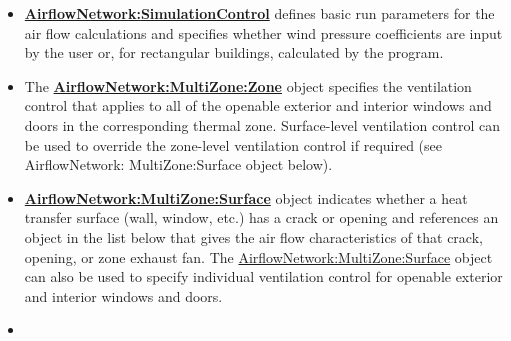 \begin{itemize}
\item
  \textbf{\hyperref[airflownetworksimulationcontrol]{AirflowNetwork:\hyperref[simulationcontrol]{SimulationControl}}} defines basic run parameters for the air flow calculations and specifies whether wind pressure coefficients are input by the user or, for rectangular buildings, calculated by the program.
\item
  The \textbf{\hyperref[airflownetworkmultizonezone]{AirflowNetwork:MultiZone:Zone}} object specifies the ventilation control that applies to all of the openable exterior and interior windows and doors in the corresponding thermal zone. Surface-level ventilation control can be used to override the zone-level ventilation control if required (see AirflowNetwork: MultiZone:Surface object below).
\item
  \textbf{\hyperref[airflownetworkmultizonesurface]{AirflowNetwork:MultiZone:Surface}} object indicates whether a heat transfer surface (wall, window, etc.) has a crack or opening and references an object in the list below that gives the air flow characteristics of that crack, opening, or zone exhaust fan. The \hyperref[airflownetworkmultizonesurface]{AirflowNetwork:MultiZone:Surface} object can also be used to specify individual ventilation control for openable exterior and interior windows and doors.
\item

\end{itemize}
